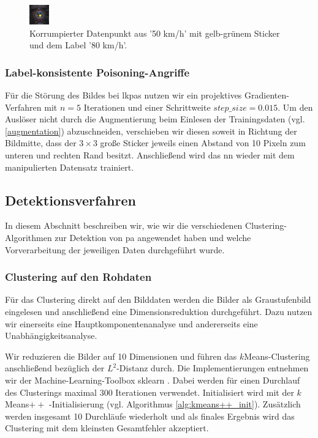 \documentclass[twoside, 12pt,a4paper]{book}
\numberwithin{equation}{section}
\begin{document}
	
	
	\begin{figure}[ht]
		\centering
		\includegraphics[width=0.15\textheight]{1450_poison.jpeg}
		
		
		\caption[Visualisierung des Standard-Angriffs]{Korrumpierter Datenpunkt aus  '50 km/h' mit gelb-grünem Sticker und dem Label '80 km/h'.}
		
		\label{im:SPA_implementation}
	\end{figure}
	
	
	\subsubsection{Label-konsistente Poisoning-Angriffe}
	
	Für die Störung des Bildes bei \acp{lkpa} nutzen wir ein projektives Gradienten-Verfahren mit  $n=5$ Iterationen und einer Schrittweite $step\_size = 0.015$. Um den Auslöser nicht durch die Augmentierung beim Einlesen der Trainingsdaten (vgl. \autoref{augmentation}) abzuschneiden, verschieben wir diesen soweit in Richtung der Bildmitte, dass der $3\times 3$ große Sticker jeweils einen Abstand von 10 Pixeln zum unteren und rechten Rand besitzt.
	Anschließend wird das \ac{nn} wieder mit dem manipulierten Datensatz trainiert.
	
	
	\subsection{Detektionsverfahren}
	In diesem Abschnitt beschreiben wir, wie wir die verschiedenen Clustering-Algorithmen zur Detektion von \ac{pa} angewendet haben und welche Vorverarbeitung der jeweiligen Daten durchgeführt wurde.
	
	\subsubsection{Clustering auf den Rohdaten}
	
	Für das Clustering direkt auf den Bilddaten werden die Bilder als Graustufenbild eingelesen und anschließend eine Dimensionsreduktion durchgeführt. Dazu nutzen wir einerseits eine Hauptkomponentenanalyse \cite{pca} und andererseits eine Unabhängigkeitsanalyse. 
	
	\noindent Wir reduzieren die Bilder auf 10 Dimensionen und führen das $k$Means-Clus\-ter\-ing anschließend bezüglich der $L^2$-Distanz durch. Die Implementierungen entnehmen wir der Machine-Learning-Toolbox sklearn \cite{sklearn}. Dabei werden für einen Durchlauf des Clusterings maximal 300 Iterationen verwendet. Initialisiert wird mit der $k$Means$++$ -Initialisierung (vgl. Algorithmus \autoref{alg:kmeans++_init}). Zusätzlich werden insgesamt 10 Durchläufe wiederholt und als finales Ergebnis wird das Clus\-ter\-ing mit dem kleinsten Gesamtfehler akzeptiert.	
	
\end{document}
